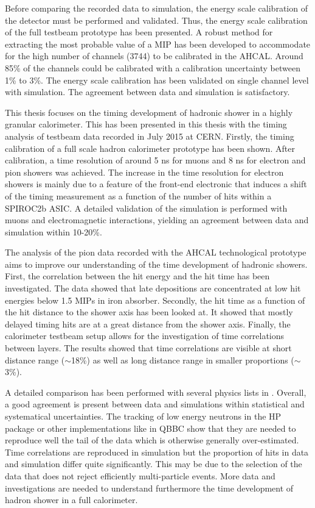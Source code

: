 Before comparing the recorded data to simulation, the energy scale calibration of the detector must be performed and validated. Thus, the energy scale calibration of the full testbeam prototype has been presented. A robust method for extracting the most probable value of a MIP has been developed to accommodate for the high number of channels (3744) to be calibrated in the AHCAL. Around 85\% of the channels could be calibrated with a calibration uncertainty between 1\% to 3\%. The energy scale calibration has been validated on single channel level with simulation. The agreement between data and simulation is satisfactory.

This thesis focuses on the timing development of hadronic shower in a highly granular calorimeter. This has been presented in this thesis with the timing analysis of testbeam data recorded in July 2015 at CERN. Firstly, the timing calibration of a full scale hadron calorimeter prototype has been shown. After calibration, a time resolution of around 5 ns for muons and 8 ns for electron and pion showers was achieved. The increase in the time resolution for electron showers is mainly due to a feature of the front-end electronic that induces a shift of the timing measurement as a function of the number of hits within a SPIROC2b ASIC. A detailed validation of the simulation is performed with muons and electromagnetic interactions, yielding an agreement between data and simulation within 10-20\%.

The analysis of the pion data recorded with the AHCAL technological prototype aims to improve our understanding of the time development of hadronic showers. First, the correlation between the hit energy and the hit time has been investigated. The data showed that late depositions are concentrated at low hit energies below 1.5 MIPs in iron absorber. Secondly, the hit time as a function of the hit distance to the shower axis has been looked at. It showed that mostly delayed timing hits are at a great distance from the shower axis. Finally, the calorimeter testbeam setup allows for the investigation of time correlations between layers. The results showed that time correlations are visible at short distance range ($\sim$18\%) as well as long distance range in smaller proportions ($\sim$3\%).

A detailed comparison has been performed with several physics lists in \geant. Overall, a good agreement is present between data and simulations within statistical and systematical uncertainties. The tracking of low energy neutrons in the HP package or other implementations like in QBBC show that they are needed to reproduce well the tail of the data which is otherwise generally over-estimated. Time correlations are reproduced in simulation but the proportion of hits in data and simulation differ quite significantly. This may be due to the selection of the data that does not reject efficiently multi-particle events. More data and investigations are needed to understand furthermore the time development of hadron shower in a full calorimeter.

